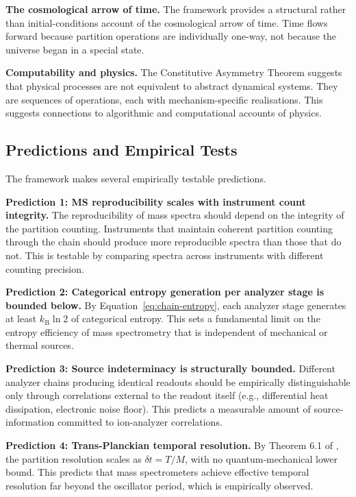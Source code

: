 \documentclass[twocolumn,10pt,a4paper]{article}
\theoremstyle{definition}
\theoremstyle{remark}
\newcommand{\kB}{k_{\mathrm{B}}}
\newcommand{\Mcount}{M}
\begin{document}
\textbf{The cosmological arrow of time.} The framework provides a structural rather than initial-conditions account of the cosmological arrow of time. Time flows forward because partition operations are individually one-way, not because the universe began in a special state.

\textbf{Computability and physics.} The Constitutive Asymmetry Theorem suggests that physical processes are not equivalent to abstract dynamical systems. They are sequences of operations, each with mechanism-specific realisations. This suggests connections to algorithmic and computational accounts of physics.

\subsection{Predictions and Empirical Tests}

The framework makes several empirically testable predictions.

\textbf{Prediction 1: MS reproducibility scales with instrument count integrity.} The reproducibility of mass spectra should depend on the integrity of the partition counting. Instruments that maintain coherent partition counting through the chain should produce more reproducible spectra than those that do not. This is testable by comparing spectra across instruments with different counting precision.

\textbf{Prediction 2: Categorical entropy generation per analyzer stage is bounded below.} By Equation~\eqref{eq:chain-entropy}, each analyzer stage generates at least $\kB \ln 2$ of categorical entropy. This sets a fundamental limit on the entropy efficiency of mass spectrometry that is independent of mechanical or thermal sources.

\textbf{Prediction 3: Source indeterminacy is structurally bounded.} Different analyzer chains producing identical readouts should be empirically distinguishable only through correlations external to the readout itself (e.g., differential heat dissipation, electronic noise floor). This predicts a measurable amount of source-information committed to ion-analyzer correlations.

\textbf{Prediction 4: Trans-Planckian temporal resolution.} By Theorem 6.1 of \citep{sachikonye2025temporal}, the partition resolution scales as $\delta t = T/\Mcount$, with no quantum-mechanical lower bound. This predicts that mass spectrometers achieve effective temporal resolution far beyond the oscillator period, which is empirically observed.
\end{document}
